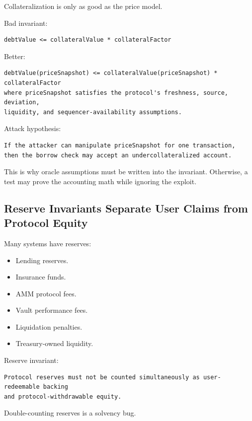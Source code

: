 Collateralization is only as good as the price model.

Bad invariant:

\begin{lstlisting}
debtValue <= collateralValue * collateralFactor
\end{lstlisting}

Better:

\begin{lstlisting}
debtValue(priceSnapshot) <= collateralValue(priceSnapshot) * collateralFactor
where priceSnapshot satisfies the protocol's freshness, source, deviation,
liquidity, and sequencer-availability assumptions.
\end{lstlisting}

Attack hypothesis:

\begin{lstlisting}
If the attacker can manipulate priceSnapshot for one transaction,
then the borrow check may accept an undercollateralized account.
\end{lstlisting}

This is why oracle assumptions must be written into the invariant.
Otherwise, a test may prove the accounting math while ignoring the
exploit.

\subsection{Reserve Invariants Separate User Claims from Protocol
Equity}

Many systems have reserves:

\begin{itemize}
\tightlist
\item
  Lending reserves.
\item
  Insurance funds.
\item
  AMM protocol fees.
\item
  Vault performance fees.
\item
  Liquidation penalties.
\item
  Treasury-owned liquidity.
\end{itemize}

Reserve invariant:

\begin{lstlisting}
Protocol reserves must not be counted simultaneously as user-redeemable backing
and protocol-withdrawable equity.
\end{lstlisting}

Double-counting reserves is a solvency bug.

